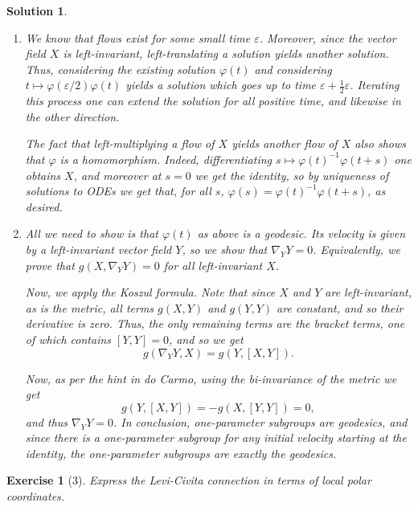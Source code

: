 \documentclass{article}
\theoremstyle{plain}
\newtheorem*{ex}{Exercise}
\theoremstyle{nonumberplain}
\newtheorem{sol}{Solution}
\begin{document}
\begin{sol}
\leavevmode
\begin{enumerate}
\item We know that flows exist for some small time $\varepsilon$. Moreover, since the vector field $X$ is left-invariant, left-translating a solution yields another solution. Thus, considering the existing solution $\varphi(t)$ and considering $t \mapsto \varphi(\varepsilon/2) \varphi(t)$ yields a solution which goes up to time $\varepsilon + \frac12 \varepsilon$. Iterating this process one can extend the solution for all positive time, and likewise in the other direction.

The fact that left-multiplying a flow of $X$ yields another flow of $X$ also shows that $\varphi$ is a homomorphism. Indeed, differentiating $s \mapsto \varphi(t)^{-1} \varphi(t+s)$ one obtains $X$, and moreover at $s = 0$ we get the identity, so by uniqueness of solutions to ODEs we get that, for all $s$, $\varphi(s) = \varphi(t)^{-1} \varphi(t+s)$, as desired.

\item All we need to show is that $\varphi(t)$ as above is a geodesic. Its velocity is given by a left-invariant vector field $Y$, so we show that $\nabla_Y Y = 0$. Equivalently, we prove that $g(X, \nabla_Y Y) = 0$ for all left-invariant $X$.

Now, we apply the Koszul formula. Note that since $X$ and $Y$ are left-invariant, as is the metric, all terms $g(X,Y)$ and $g(Y,Y)$ are constant, and so their derivative is zero. Thus, the only remaining terms are the bracket terms, one of which contains $[Y,Y] = 0$, and so we get
\begin{equation}
g(\nabla_Y Y, X) = g(Y, [X,Y]).
\end{equation}

Now, as per the hint in do Carmo, using the bi-invariance of the metric we get
\begin{equation}
g(Y, [X,Y]) = - g(X, [Y,Y]) = 0,
\end{equation}
and thus $\nabla_Y Y = 0$. In conclusion, one-parameter subgroups are geodesics, and since there is a one-parameter subgroup for any initial velocity starting at the identity, the one-parameter subgroups are exactly the geodesics.
\end{enumerate}
\end{sol}

\begin{ex}[3]
Express the Levi-Civita connection in terms of local polar coordinates.
\end{ex}
\end{document}
